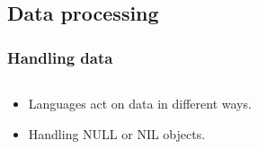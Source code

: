 \documentclass{beamer}
\begin{document}
\subsection{Data processing}
\begin{frame}
  \frametitle{Handling data}
  
  \begin{columns}
  \begin{column}{0.5\textwidth}
  \begin{itemize}
  \item Languages act on data in different ways. %
  \item Handling NULL or NIL objects.
  \end{itemize}
  \end{column}
  

\end{columns}
\end{frame}
\end{document}
